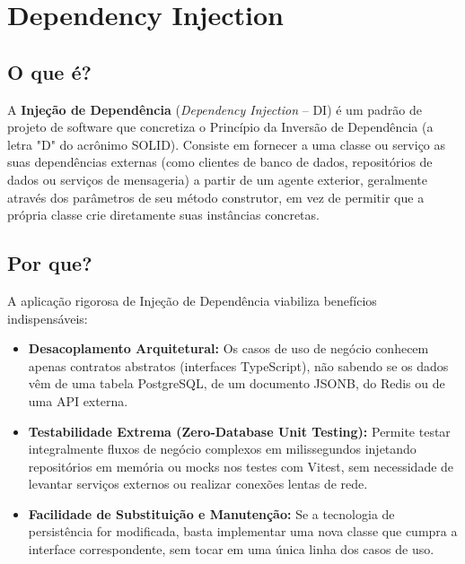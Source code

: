 \documentclass[12pt,a4paper]{article}
\begin{document}
\section{Dependency Injection}

\subsection{O que é?}
A \textbf{Injeção de Dependência} (\textit{Dependency Injection} -- DI) é um padrão de projeto de software que concretiza o Princípio da Inversão de Dependência (a letra "D" do acrônimo SOLID). Consiste em fornecer a uma classe ou serviço as suas dependências externas (como clientes de banco de dados, repositórios de dados ou serviços de mensageria) a partir de um agente exterior, geralmente através dos parâmetros de seu método construtor, em vez de permitir que a própria classe crie diretamente suas instâncias concretas.

\subsection{Por que?}
A aplicação rigorosa de Injeção de Dependência viabiliza benefícios indispensáveis:
\begin{itemize}
  \item \textbf{Desacoplamento Arquitetural:} Os casos de uso de negócio conhecem apenas contratos abstratos (interfaces TypeScript), não sabendo se os dados vêm de uma tabela PostgreSQL, de um documento JSONB, do Redis ou de uma API externa.
  \item \textbf{Testabilidade Extrema (Zero-Database Unit Testing):} Permite testar integralmente fluxos de negócio complexos em milissegundos injetando repositórios em memória ou mocks nos testes com Vitest, sem necessidade de levantar serviços externos ou realizar conexões lentas de rede.
  \item \textbf{Facilidade de Substituição e Manutenção:} Se a tecnologia de persistência for modificada, basta implementar uma nova classe que cumpra a interface correspondente, sem tocar em uma única linha dos casos de uso.
\end{itemize}
\end{document}
